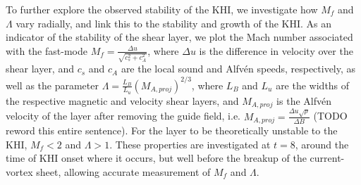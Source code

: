 To further explore the observed stability of the KHI, we investigate how $M_f$ and $\Lambda$ vary radially, and link this to the stability and growth of the KHI. As an indicator of the stability of the shear layer, we plot the Mach number associated with the fast-mode $M_f = \frac{\Delta u}{\sqrt{c_s^2 + c_A^2}}$, where $\Delta u$ is the difference in velocity over the shear layer, and $c_s$ and $c_A$ are the local sound and Alfv\'en speeds, respectively, as well as the parameter $\Lambda = \frac{L_B}{L_u}(M_{A, proj})^{2/3}$, where $L_B$ and $L_u$ are the widths of the respective magnetic and velocity shear layers, and $M_{A, proj}$ is the Alfv\'en velocity of the layer after removing the guide field, i.e. $M_{A, proj} = \frac{\Delta u \sqrt{\rho}}{\Delta B}$ (TODO reword this entire sentence). For the layer to be theoretically unstable to the KHI, $M_f < 2$ and $\Lambda > 1$. These properties are investigated at $t=8$, around the time of KHI onset where it occurs, but well before the breakup of the current-vortex sheet, allowing accurate measurement of $M_f$ and $\Lambda$.

